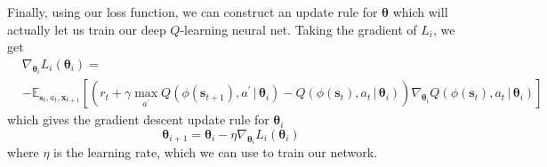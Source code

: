 \documentclass[12pt,letterpaper]{hmcpset}
\newcommand{\pn}[1]{\left(#1\right)}
\newcommand{\bk}[1]{\left[#1\right]}
\newcommand{\given}{\,|\,}
\newcommand{\bbm}[1]{\mathbb{#1}}
\begin{document}
Finally, using our loss function, we can construct an update rule for $\bm \theta$ which will actually let us train our deep $Q$-learning neural net. Taking the gradient of $L_i$, we get
\begin{align*}
& \nabla_{\bm\theta_i} L_i(\bm\theta_i) = \\
& -\bbm E_{\bm s_t, a_t, \bm x_{t+1}} \bk{\pn{r_t + \gamma \max_{a^\prime} Q(\phi(\bm s_{t+1}), a^\prime \given \bm\theta_i) - Q(\phi(\bm s_t), a_t \given \bm\theta_i)} \nabla_{\bm\theta_i} Q(\phi(\bm s_t), a_t \given \bm\theta_i)}
\end{align*}
which gives the gradient descent update rule for $\bm \theta_i$
\[
    \bm \theta_{i+1} = \bm \theta_i - \eta \nabla_{\bm \theta_i} L_i(\bm \theta_i)
\]
where $\eta$ is the learning rate, which we can use to train our network.
\end{document}
